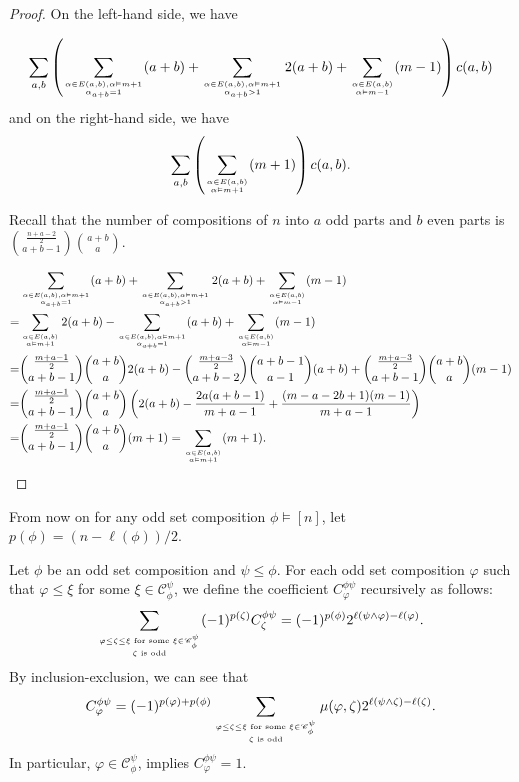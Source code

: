 \documentclass[11pt]{amsart}
\numberwithin{equation}{section}
\begin{document}
\begin{proof}
	On the left-hand side, we have
	
	\begin{align*}
		\sum_{a,b}\left(\sum_{\alpha\in E(a,b),\alpha\vDash m+1 \atop \alpha_{a+b}=1}(a+b)+\sum_{\alpha\in E(a,b),\alpha\vDash m+1 \atop \alpha_{a+b}>1}2(a+b)+\sum_{\alpha\in E(a,b) \atop \alpha\vDash m-1}(m-1)\right)c(a,b)
	\end{align*}
	and on the right-hand side, we have
	$$\sum_{a,b}\left(\sum_{\alpha\in E(a,b) \atop \alpha\vDash m+1}(m+1)\right)c(a,b).$$
	
	Recall that the number of compositions of $n$ into $a$ odd parts and $b$ even parts is $\displaystyle\binom{\frac{n+a-2}{2}}{a+b-1}\binom{a+b}{a}$.
	
	\begin{align*}
		&\sum_{\alpha\in E(a,b),\alpha\vDash m+1 \atop \alpha_{a+b}=1}(a+b)+\sum_{\alpha\in E(a,b),\alpha\vDash m+1 \atop \alpha_{a+b}>1}2(a+b)+\sum_{\alpha\in E(a,b) \atop \alpha\vDash m-1}(m-1)\\
		=&\sum_{\alpha\in E(a,b)\atop \alpha\vDash m+1}2(a+b)-\sum_{\alpha\in E(a,b),\alpha\vDash m+1 \atop \alpha_{a+b}=1}(a+b)+\sum_{\alpha\in E(a,b) \atop \alpha\vDash m-1}(m-1)\\
		=&\binom{\frac{m+a-1}{2}}{a+b-1}\binom{a+b}{a}2(a+b)-\binom{\frac{m+a-3}{2}}{a+b-2}\binom{a+b-1}{a-1}(a+b)+\binom{\frac{m+a-3}{2}}{a+b-1}\binom{a+b}{a}(m-1)\\
		=&\binom{\frac{m+a-1}{2}}{a+b-1}\binom{a+b}{a}\left(2(a+b)-\frac{2a(a+b-1)}{m+a-1}+\frac{(m-a-2b+1)(m-1)}{m+a-1}\right)\\
		=&\binom{\frac{m+a-1}{2}}{a+b-1}\binom{a+b}{a}(m+1)=\sum_{\alpha\in E(a,b) \atop \alpha\vDash m+1}(m+1).
	\end{align*}
\end{proof}

From now on for any odd set composition $\phi\vDash [n]$, let $p(\phi)=(n-\ell(\phi))/2$. 

Let $\phi$ be an odd set composition and $\psi\leq\phi$. For each odd set composition $\varphi$ such that $\varphi\leq\xi$ for some $\xi\in\mathscr{C}_\phi^\psi$, we define the coefficient $C_\varphi^{\phi\psi}$ recursively as follows:
$$\sum_{\varphi\leq\zeta\leq\xi\text{ for some }\xi\in\mathscr{C}_\phi^\psi \atop \zeta\text{ is odd}}(-1)^{p(\zeta)}C_\zeta^{\phi\psi}=(-1)^{p(\phi)}2^{\ell(\psi\land\varphi)-\ell(\varphi)}.$$ 
By inclusion-exclusion, we can see that
$$C_\varphi^{\phi\psi}=(-1)^{p(\varphi)+p(\phi)}\sum_{\varphi\leq\zeta\leq\xi\text{ for some }\xi\in\mathscr{C}_\phi^\psi \atop \zeta\text{ is odd}}\mu(\varphi,\zeta)2^{\ell(\psi\land\zeta)-\ell(\zeta)}.$$
In particular, $\varphi\in\mathscr{C}_\phi^\psi$, implies $C_\varphi^{\phi\psi}=1$. 
\end{document}
